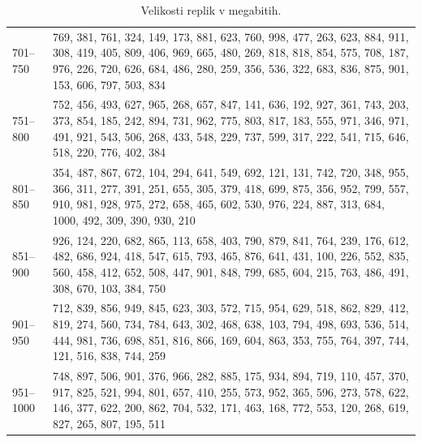 \documentclass[a4paper, 12pt]{book}
\begin{document}
\begin{appendices}
\begin{table}
\begin{center}
\begin{tabulary}{1.0\textwidth}{p{1.3cm} p{11.58cm}}
      701--750 & 769, 381, 761, 324, 149, 173, 881, 623, 760, 998, 477, 263, 623, 884, 911, 308, 419, 405, 809, 406, 969, 665, 480, 269, 818, 818, 854, 575, 708, 187, 976, 226, 720, 626, 684, 486, 280, 259, 356, 536, 322, 683, 836, 875, 901, 153, 606, 797, 503, 834 \\
      751--800 & 752, 456, 493, 627, 965, 268, 657, 847, 141, 636, 192, 927, 361, 743, 203, 373, 854, 185, 242, 894, 731, 962, 775, 803, 817, 183, 555, 971, 346, 971, 491, 921, 543, 506, 268, 433, 548, 229, 737, 599, 317, 222, 541, 715, 646, 518, 220, 776, 402, 384 \\
      801--850 & 354, 487, 867, 672, 104, 294, 641, 549, 692, 121, 131, 742, 720, 348, 955, 366, 311, 277, 391, 251, 655, 305, 379, 418, 699, 875, 356, 952, 799, 557, 910, 981, 928, 975, 272, 658, 465, 602, 530, 976, 224, 887, 313, 684, 1000, 492, 309, 390, 930, 210 \\
      851--900 & 926, 124, 220, 682, 865, 113, 658, 403, 790, 879, 841, 764, 239, 176, 612, 482, 686, 924, 418, 547, 615, 793, 465, 876, 641, 431, 100, 226, 552, 835, 560, 458, 412, 652, 508, 447, 901, 848, 799, 685, 604, 215, 763, 486, 491, 308, 670, 103, 384, 750 \\
      901--950 & 712, 839, 856, 949, 845, 623, 303, 572, 715, 954, 629, 518, 862, 829, 412, 819, 274, 560, 734, 784, 643, 302, 468, 638, 103, 794, 498, 693, 536, 514, 444, 981, 736, 698, 851, 816, 866, 169, 604, 863, 353, 755, 764, 397, 744, 121, 516, 838, 744, 259 \\
      951--1000 & 748, 897, 506, 901, 376, 966, 282, 885, 175, 934, 894, 719, 110, 457, 370, 917, 825, 521, 994, 801, 657, 410, 255, 573, 952, 365, 596, 273, 578, 622, 146, 377, 622, 200, 862, 704, 532, 171, 463, 168, 772, 553, 120, 268, 619, 827, 265, 807, 195, 511 \\
    \end{tabulary}
  \end{center}

  \caption{Velikosti replik v megabitih.}
  \label{tbl:sim_replica_sizes}
\end{table}



\end{appendices}
\end{document}
